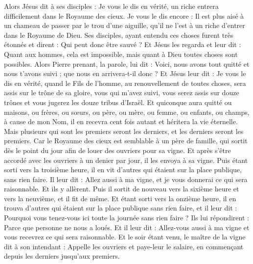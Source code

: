 \begin{multicols}{2}
Alors Jésus dit à ses disciples : Je vous le dis en vérité, un riche entrera difficilement dans le Royaume des cieux.
Je vous le dis encore : Il est plus aisé à un chameau de passer par le trou d'une aiguille, qu'il ne l'est à un riche d'entrer dans le Royaume de Dieu.
Ses disciples, ayant entendu ces choses furent très étonnés et dirent : Qui peut donc être sauvé ?
Et Jésus les regarda et leur dit : Quant aux hommes, cela est impossible, mais quant à Dieu toutes choses sont possibles.
Alors Pierre prenant, la parole, lui dit : Voici, nous avons tout quitté et nous t'avons suivi ; que nous en arrivera-t-il donc ?
Et Jésus leur dit : Je vous le dis en vérité, quand le Fils de l'homme, au renouvellement de toutes choses, sera assis sur le trône de sa gloire, vous qui m'avez suivi, vous serez assis sur douze trônes et vous jugerez les douze tribus d'Israël.
Et quiconque aura quitté ou maisons, ou frères, ou sœurs, ou père, ou mère, ou femme, ou enfants, ou champs, à cause de mon Nom, il en recevra cent fois autant et héritera la vie éternelle.
Mais plusieurs qui sont les premiers seront les derniers, et les derniers seront les premiers.
\VerseOne{} Car le Royaume des cieux est semblable à un père de famille, qui sortit dès le point du jour afin de louer des ouvriers pour sa vigne.
Et après s'être accordé avec les ouvriers à un denier par jour, il les envoya à sa vigne.
Puis étant sorti vers la troisième heure, il en vit d'autres qui étaient sur la place publique, sans rien faire.
Il leur dit : Allez aussi à ma vigne, et je vous donnerai ce qui sera raisonnable.
Et ils y allèrent. Puis il sortit de nouveau vers la sixième heure et vers la neuvième, et il fit de même.
Et étant sorti vers la onzième heure, il en trouva d'autres qui étaient sur la place publique sans rien faire, et il leur dit : Pourquoi vous tenez-vous ici toute la journée sans rien faire ?
Ils lui répondirent : Parce que personne ne nous a loués. Et il leur dit : Allez-vous aussi à ma vigne et vous recevrez ce qui sera raisonnable.
Et le soir étant venu, le maître de la vigne dit à son intendant : Appelle les ouvriers et paye-leur le salaire, en commençant depuis les derniers jusqu'aux premiers.

\end{multicols}
